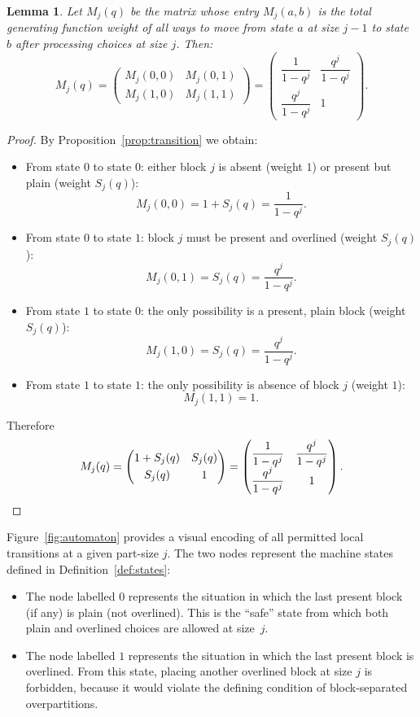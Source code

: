 \documentclass[letterpaper,12pt]{article}
\newtheorem{lemma}{Lemma}
\begin{document}
\begin{lemma}\label{def:Mj}
Let \(M_j(q)\) be the matrix whose entry \(M_j(a,b)\) is the total generating
function weight of all ways to move from state \(a\) at size \(j-1\) to state \(b\)
after processing choices at size \(j\). Then:
\begin{equation}
    M_j(q) =
\begin{pmatrix}
M_j(0,0) & M_j(0,1) \\[3pt]
M_j(1,0) & M_j(1,1)
\end{pmatrix}=
\begin{pmatrix}
\dfrac{1}{1-q^j} & \dfrac{q^j}{1-q^j} \\[5pt]
\dfrac{q^j}{1-q^j} & 1
\end{pmatrix}.
\end{equation}
\end{lemma}
\begin{proof}
    By Proposition~\ref{prop:transition} we obtain:
\begin{itemize}
  \item From state \(0\) to state \(0\): either block \(j\) is absent
  (weight \(1\)) or present but plain (weight \(S_j(q)\)):
  \[
  M_j(0,0) = 1+S_j(q) = \frac{1}{1-q^j}.
  \]
  \item From state \(0\) to state \(1\): block \(j\) must be present and overlined
  (weight \(S_j(q)\)):
  \[
  M_j(0,1) = S_j(q) = \frac{q^j}{1-q^j}.
  \]
  \item From state \(1\) to state \(0\): the only possibility is a present, plain block
  (weight \(S_j(q)\)):
  \[
  M_j(1,0) = S_j(q) = \frac{q^j}{1-q^j}.
  \]
  \item From state \(1\) to state \(1\): the only possibility is absence of block \(j\)
  (weight \(1\)):
  \[
  M_j(1,1) = 1.
  \]
\end{itemize}
Therefore
\[
M_j(q) =
\begin{pmatrix}
1 + S_j(q) & S_j(q) \\[3pt]
S_j(q) & 1
\end{pmatrix}
=
\begin{pmatrix}
\dfrac{1}{1-q^j} & \dfrac{q^j}{1-q^j} \\[5pt]
\dfrac{q^j}{1-q^j} & 1
\end{pmatrix}.\qedhere
\]
\end{proof}


Figure~\ref{fig:automaton} provides a  visual encoding of all permitted
local transitions at a given part-size \(j\). The two nodes represent the
machine states defined in Definition~\ref{def:states}:
\begin{itemize}
  \item The node labelled \(0\) represents the situation in which the last
  present block (if any) is plain (not overlined). This is the ``safe''
  state from which both plain and overlined choices are allowed at size~\(j\).
  \item The node labelled \(1\) represents the situation in which the last
  present block is overlined. From this state, placing another overlined
  block at size \(j\) is forbidden, because it would violate the defining
  condition of block-separated overpartitions.
\end{itemize}
\end{document}
